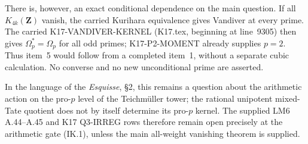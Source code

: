 \documentclass[11pt,a4paper]{article}
\theoremstyle{definition}
\begin{document}
There is, however, an exact conditional dependence on the
main question. If all $K_{4k}(\mathbf Z)$ vanish, the carried
Kurihara equivalence gives Vandiver at every prime. The
carried K17-VANDIVER-KERNEL (K17.tex, beginning at line~9305)
then gives $\Omega_p^*=\Omega_p$ for all odd primes; K17-P2-MOMENT
already supplies $p=2$. Thus item~5 would follow from a
completed item~1, without a separate cubic calculation.
No converse and no new unconditional prime are asserted.

In the language of the \emph{Esquisse}, \S2, this remains
a question about the arithmetic action on the pro-$p$
level of the Teichm\"uller tower; the rational unipotent
mixed-Tate quotient does not by itself determine its
pro-$p$ kernel. The supplied LM6 A.44--A.45 and K17
Q3-IRREG rows therefore remain open precisely at the
arithmetic gate (IK.1), unless the main all-weight
vanishing theorem is supplied.


\end{document}
